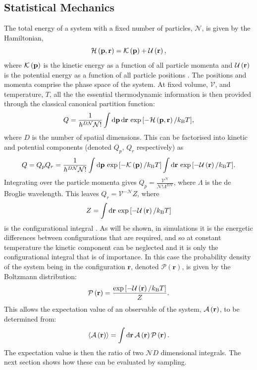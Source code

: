 \subsection{Statistical Mechanics}

The total energy of a system with a fixed number of particles, $\mathcal{N}$, is given by the Hamiltonian,
\begin{equation}
	\mathcal{H}\left(\mathbf{p},\mathbf{r}\right) = \mathcal{K}\left(\mathbf{p}\right)+\mathcal{U}\left(\mathbf{r}\right),
\end{equation}
where $\mathcal{K}\left(\mathbf{p}\right)$ is the kinetic energy as a function of all particle momenta and $\mathcal{U}\left(\mathbf{r}\right)$ is the potential energy as a function of all particle positions \cite{Frenkel2002}.
The positions and momenta comprise the phase space of the system.
At fixed volume, $\mathcal{V}$, and temperature, $T$, all the the essential thermodynamic information is then provided through the classical canonical partition function:
\begin{equation}
	Q = \frac{1}{h^{D\mathcal{N}}\mathcal{N}!}\int \text{d}\mathbf{p}\,\text{d}\mathbf{r}\,\exp{\left[-\mathcal{H}\left(\mathbf{p},\mathbf{r}\right)/ k_\text{B}T\right]},
\end{equation}
where $D$ is the number of spatial dimensions.
This can be factorised into kinetic and potential components (denoted $Q_p$, $Q_r$ respectively) as
\begin{equation}
	Q = Q_p Q_r = \frac{1}{h^{D\mathcal{N}}\mathcal{N}!}\int \text{d}\mathbf{p}\,\exp{\left[-\mathcal{K}\left(\mathbf{p}\right)/k_\text{B}T\right]} \int \text{d}\mathbf{r}\,\exp{\left[-\mathcal{U}\left(\mathbf{r}\right)/k_\text{B}T\right]}.
\end{equation}
Integrating over the particle momenta gives $Q_p = \frac{\mathcal{V}^\mathcal{N}}{\mathcal{N}!\Lambda^{D\mathcal{N}}}$, where $\Lambda$ is the de Broglie wavelength. This leaves $Q_r=\mathcal{V}^{-\mathcal{N}}Z$, where
\begin{equation}
	Z = \int \text{d}\mathbf{r}\,\exp{\left[-\mathcal{U}\left(\mathbf{r}\right)/k_\text{B}T\right]}
\end{equation}
is the configurational integral \cite{Allen2017}. 
As will be shown, in \mc{} simulations it is the energetic differences between configurations that are required, and so at constant temperature the kinetic component can be neglected and it is only the configurational integral that is of importance.
In this case the probability density of the system being in the configuration $\mathbf{r}$, denoted $\mathcal{P}\left(\mathbf{r}\right)$, is given by the Boltzmann distribution:
\begin{equation}
	\label{eq:boltzmann}
	\mathcal{P}\left(\mathbf{r}\right) = \frac{\exp{\left[-\mathcal{U}\left(\mathbf{r}\right)/k_\text{B}T\right]}}{Z}.
\end{equation}
This allows the expectation value of an observable of the system, $\mathcal{A}\left(\mathbf{r}\right)$, to be determined from:
\begin{equation}
	\label{eq:expectationobs}
		\langle \mathcal{A}\left(\mathbf{r}\right) \rangle = \int \text{d}\mathbf{r}\,\mathcal{A}\left(\mathbf{r}\right) \mathcal{P}\left(\mathbf{r}\right).
\end{equation} 
The expectation value is then the ratio of two $\mathcal{N}D$ dimensional integrals.
The next section shows how these can be evaluated by \mc{} sampling.

